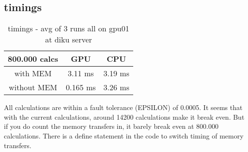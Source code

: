 \documentclass[a4paper,10pt]{article}
\begin{document}
\subsection{timings}

\begin{table}[ht]
\caption{timings - avg of 3 runs all on gpu01 at diku server}
\centering
\begin{tabular}{c|c|c}
 800.000 calcs & GPU & CPU \\
\hline with MEM & 3.11 ms & 3.19 ms\\
\hline without MEM & 0.165 ms & 3.26 ms
\end{tabular}
\end{table}
All calculations are within a fault tolerance (EPSILON) of 0.0005.
It seems that with the current calculations, around 14200 calculations make it break even. 
But if you do count the memory transfers in, it barely break even at 800.000 calculations.
There is a define statement in the code to switch timing of memory transfers.
\end{document}
